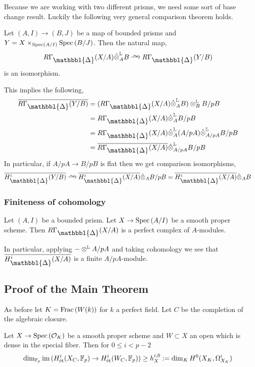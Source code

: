 \documentclass[12pt]{article}
\newcommand{\Prism}{{\mathlarger{\mathbbl{\Delta}}}}
\begin{document}
Because we are working with two different prisms, we need some sort of base change result. Luckily the following very general comparison theorem holds. 

\begin{theorem}
Let $(A, I) \to (B, J)$ be a map of bounded prisms and $Y = X \times_{\mathrm{Spec}\left( A/I \right)} \mathrm{Spec}\left( B/J \right)$. Then the natural map,
\[ R \Gamma_{\Prism}(X/A) \hat{\ot}^{\LL}_{A} B \iso R \Gamma_{\Prism}(Y/B) \]
is an isomorphism. 
\end{theorem}

This implies the following,
\begin{align*}
\ol{R \Gamma_{\Prism}(Y/B)} & = (R \Gamma_{\Prism}(X/A) \hat{\ot}^{\LL}_A B) \ot^{\LL}_B B / p B
\\
& = R \Gamma_{\Prism}(X/A) \hat{\ot}^{\LL}_A B / p B
\\
& = R \Gamma_{\Prism}(X/A) \hat{\ot}^{\LL}_A (A / p A) \hat{\ot}^{\LL}_{A / p A} B / p B
\\
& = \ol{R \Gamma_{\Prism}(X/A)} \hat{\ot}^{\LL}_{A / p A} B / p B
\end{align*}
In particular, if $A / p A \to B / p B$ is flat then we get comparison isomorphisms,
\[ \ol{H^i_{\Prism}(Y/B)} \iso \ol{H^i_{\Prism}(X/A)} \hat{\ot}_{A} B / p B = \ol{H^i_{\Prism}(X/A)} \hat{\ot}_A B \]

\subsubsection{Finiteness of cohomology}

\begin{theorem}
Let $(A, I)$ be a bounded prism. Let $X \to \mathrm{Spec}\left( A/I \right)$ be a smooth proper scheme. Then $R \Gamma_{\Prism}(X/A)$ is a perfect complex of $A$-modules. 
\end{theorem}

In particular, applying $- \otimes^{\mathbb{L}} A / pA$ and taking cohomology we see that $\ol{H^i_{\Prism}(X/A)}$ is a finite $A/pA$-module.

\subsection{Proof of the Main Theorem}

As before let $K = \mathrm{Frac}\left(W(k)\right)$ for $k$ a perfect field. Let $C$ be the completion of the algebraic closure.

\begin{theorem}
Let $X \to \mathrm{Spec}\left( \mathcal{O}_K \right)$ be a smooth proper scheme and $W \subset X$ an open which is dense in the special fiber. Then for $0 \le i < p - 2$
\[ \dim_{\mathbb{F}_p} \operatorname{\mathrm{im}}{(H^i_{\text{\'{e}t}}(X_C, \mathbb{F}_p) \to H^i_{\text{\'{e}t}}(W_C, \mathbb{F}_p))} \ge h^{i,0}_X := \dim_{K} H^0(X_K, \Omega_{X_K}^i) \]
\end{theorem}
\end{document}
